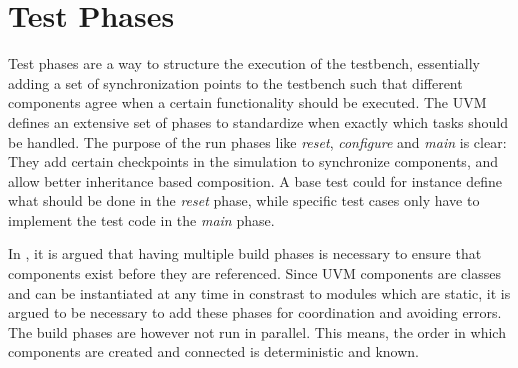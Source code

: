 \section{Test Phases} %

Test phases are a way to structure the execution of the testbench, essentially adding a set of synchronization points
to the testbench such that different components agree when a certain functionality should be executed. The UVM
defines an extensive set of phases to standardize when exactly which tasks should be handled. The purpose of the run
phases like \textit{reset}, \textit{configure} and \textit{main} is clear: They add certain checkpoints in the
simulation to synchronize components, and allow better inheritance based composition. A base test could for instance
define what should be done in the \textit{reset} phase, while specific test cases only have to implement the test
code in the \textit{main} phase.

In \cite{uvm_phases}, it is argued that having multiple build phases is necessary to ensure that components exist
before they are referenced. Since UVM components are classes and can be instantiated at any time in constrast to
modules which are static, it is argued to be necessary to add these phases for coordination and avoiding errors. The build phases are however not run in parallel. This means, the order in which components are created and connected is deterministic and known.


